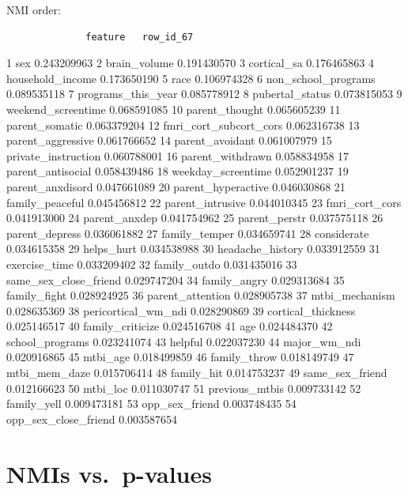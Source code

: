 \documentclass[
  letterpaper,
  DIV=11,
  numbers=noendperiod]{scrreprt}
\begin{document}
NMI order:

\begin{verbatim}
              feature   row_id_67
\end{verbatim}

1 sex 0.243209963 2 brain\_volume 0.191430570 3 cortical\_sa 0.176465863
4 household\_income 0.173650190 5 race 0.106974328 6
non\_school\_programs 0.089535118 7 programs\_this\_year 0.085778912 8
pubertal\_status 0.073815053 9 weekend\_screentime 0.068591085 10
parent\_thought 0.065605239 11 parent\_somatic 0.063379204 12
fmri\_cort\_subcort\_cors 0.062316738 13 parent\_aggressive 0.061766652
14 parent\_avoidant 0.061007979 15 private\_instruction 0.060788001 16
parent\_withdrawn 0.058834958 17 parent\_antisocial 0.058439486 18
weekday\_screentime 0.052901237 19 parent\_anxdisord 0.047661089 20
parent\_hyperactive 0.046030868 21 family\_peaceful 0.045456812 22
parent\_intrusive 0.044010345 23 fmri\_cort\_cors 0.041913000 24
parent\_anxdep 0.041754962 25 parent\_perstr 0.037575118 26
parent\_depress 0.036061882 27 family\_temper 0.034659741 28 considerate
0.034615358 29 helps\_hurt 0.034538988 30 headache\_history 0.033912559
31 exercise\_time 0.033209402 32 family\_outdo 0.031435016 33
same\_sex\_close\_friend 0.029747204 34 family\_angry 0.029313684 35
family\_fight 0.028924925 36 parent\_attention 0.028905738 37
mtbi\_mechanism 0.028635369 38 pericortical\_wm\_ndi 0.028290869 39
cortical\_thickness 0.025146517 40 family\_criticize 0.024516708 41 age
0.024484370 42 school\_programs 0.023241074 43 helpful 0.022037230 44
major\_wm\_ndi 0.020916865 45 mtbi\_age 0.018499859 46 family\_throw
0.018149749 47 mtbi\_mem\_daze 0.015706414 48 family\_hit 0.014753237 49
same\_sex\_friend 0.012166623 50 mtbi\_loc 0.011030747 51
previous\_mtbis 0.009733142 52 family\_yell 0.009473181 53
opp\_sex\_friend 0.003748435 54 opp\_sex\_close\_friend 0.003587654

\section{NMIs vs.~p-values}\label{nmis-vs.-p-values}
\end{document}
